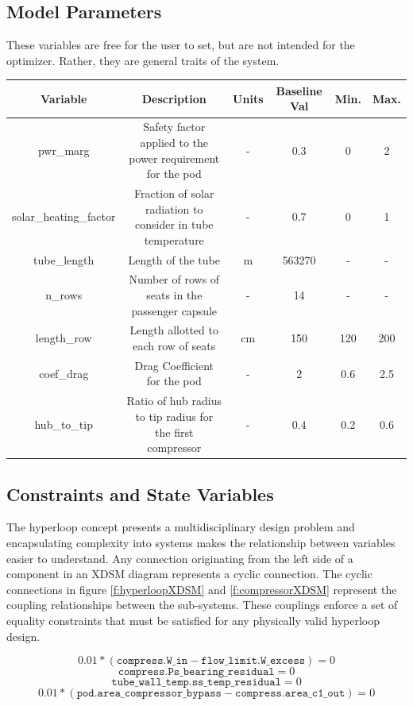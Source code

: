 \documentclass[heading.tex]{subfiles}
\begin{document}
\subsection{Model Parameters}
These variables are free for the user to set, but are not intended for the optimizer. Rather, they are general traits of the system.

\begin{adjustwidth}{-3cm}{-3cm}
\begin{tabular}{|c|c|c|c|c|c|}
\hline 
Variable & Description & Units & Baseline Val & Min. & Max. \\ 
\hline 
pwr\_marg & Safety factor applied to the power requirement for the pod & - & 0.3 & 0 & 2 \\ 
\hline 
solar\_heating\_factor & Fraction of solar radiation to consider in tube temperature & - & 0.7 & 0 & 1 \\ 
\hline 
tube\_length & Length of the tube & m & 563270 & - & - \\ 
\hline 
n\_rows & Number of rows of seats in the passenger capsule & - & 14 & - & - \\ 
\hline 
length\_row & Length allotted to each row of seats & cm & 150 & 120 & 200 \\ 
\hline 
coef\_drag & Drag Coefficient for the pod & - & 2 & 0.6 & 2.5 \\ 
\hline 
hub\_to\_tip & Ratio of hub radius to tip radius for the first compressor & - & 0.4 & 0.2 & 0.6 \\ 
\hline 
\end{tabular} 
\end{adjustwidth}

\subsection{Constraints and State Variables}

The hyperloop concept presents a multidisciplinary design problem and encapsulating complexity into systems makes the relationship
between variables easier to understand.  Any connection originating from the left side of a component in an XDSM diagram represents a
cyclic connection. The cyclic connections in figure \ref{f:hyperloopXDSM}  and \ref{f:compressorXDSM} represent the coupling relationships
between the sub-systems. These couplings enforce a set of equality constraints that must be satisfied for any physically valid hyperloop design. 

\begin{equation} \label{eq:flow}
	0.01*(\texttt{compress.W\_in} - \texttt{flow\_limit.W\_excess}) = 0
\end{equation}
\begin{equation}
	\texttt{compress.Ps\_bearing\_residual} = 0
\end{equation}
\begin{equation}
	\texttt{tube\_wall\_temp.ss\_temp\_residual} = 0
\end{equation}
\begin{equation} \label{eq:area}
	0.01*(\texttt{pod.area\_compressor\_bypass} - \texttt{compress.area\_c1\_out}) = 0
\end{equation}
\end{document}
